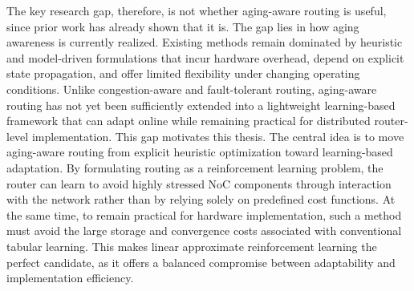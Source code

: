 The key research gap, therefore, is not whether aging-aware routing is useful, since prior work has already shown that it is. The gap lies in how aging awareness is currently realized. Existing methods remain dominated by heuristic and model-driven formulations that incur hardware overhead, depend on explicit state propagation, and offer limited flexibility under changing operating conditions. Unlike congestion-aware and fault-tolerant routing, aging-aware routing has not yet been sufficiently extended into a lightweight learning-based framework that can adapt online while remaining practical for distributed router-level implementation. This gap motivates this thesis. The central idea is to move aging-aware routing from explicit heuristic optimization toward learning-based adaptation. By formulating routing as a reinforcement learning problem, the router can learn to avoid highly stressed NoC components through interaction with the network rather than by relying solely on predefined cost functions. At the same time, to remain practical for hardware implementation, such a method must avoid the large storage and convergence costs associated with conventional tabular learning. This makes linear approximate reinforcement learning \cite{LARE2023} the perfect candidate, as it offers a balanced compromise between adaptability and implementation efficiency.